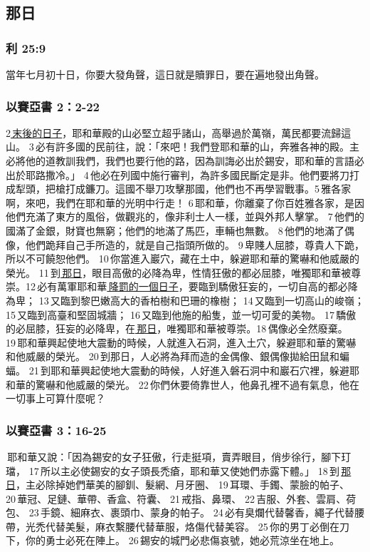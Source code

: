 \subsection{那日}
\subsubsection{利 25:9}
當年七月初十日，你要大發角聲，這日就是贖罪日，要在遍地發出角聲。

\subsubsection{以賽亞書 2：2-22}
2\underline{ 末後的日子}，耶和華殿的山必堅立超乎諸山，高舉過於萬嶺，萬民都要流歸這山。 3 必有許多國的民前往，說：「來吧！我們登耶和華的山，奔雅各神的殿。主必將他的道教訓我們，我們也要行他的路，因為訓誨必出於錫安，耶和華的言語必出於耶路撒冷。」 4 他必在列國中施行審判，為許多國民斷定是非。他們要將刀打成犁頭，把槍打成鐮刀。這國不舉刀攻擊那國，他們也不再學習戰事。5 雅各家啊，來吧，我們在耶和華的光明中行走！ 6 耶和華，你離棄了你百姓雅各家，是因他們充滿了東方的風俗，做觀兆的，像非利士人一樣，並與外邦人擊掌。 7 他們的國滿了金銀，財寶也無窮；他們的地滿了馬匹，車輛也無數。 8 他們的地滿了偶像，他們跪拜自己手所造的，就是自己指頭所做的。 9 卑賤人屈膝，尊貴人下跪，所以不可饒恕他們。 10 你當進入巖穴，藏在土中，躲避耶和華的驚嚇和他威嚴的榮光。 11 到\underline{ 那日}，眼目高傲的必降為卑，性情狂傲的都必屈膝，唯獨耶和華被尊崇。12 必有萬軍耶和華\underline{ 降罰的一個日子}，要臨到驕傲狂妄的，一切自高的都必降為卑； 13 又臨到黎巴嫩高大的香柏樹和巴珊的橡樹； 14 又臨到一切高山的峻嶺； 15 又臨到高臺和堅固城牆； 16 又臨到他施的船隻，並一切可愛的美物。 17 驕傲的必屈膝，狂妄的必降卑，在\underline{ 那日}，唯獨耶和華被尊崇。18 偶像必全然廢棄。 19 耶和華興起使地大震動的時候，人就進入石洞，進入土穴，躲避耶和華的驚嚇和他威嚴的榮光。 20 到那日，人必將為拜而造的金偶像、銀偶像拋給田鼠和蝙蝠。 21 到耶和華興起使地大震動的時候，人好進入磐石洞中和巖石穴裡，躲避耶和華的驚嚇和他威嚴的榮光。 22 你們休要倚靠世人，他鼻孔裡不過有氣息，他在一切事上可算什麼呢？


\subsubsection{以賽亞書 3：16-25}
 耶和華又說：「因為錫安的女子狂傲，行走挺項，賣弄眼目，俏步徐行，腳下玎璫， 17 所以主必使錫安的女子頭長禿瘡，耶和華又使她們赤露下體。」 18 到 \underline{那日}，主必除掉她們華美的腳釧、髮網、月牙圈、 19 耳環、手鐲、蒙臉的帕子、 20 華冠、足鏈、華帶、香盒、符囊、 21 戒指、鼻環、 22 吉服、外套、雲肩、荷包、 23 手鏡、細麻衣、裹頭巾、蒙身的帕子。 24 必有臭爛代替馨香，繩子代替腰帶，光禿代替美髮，麻衣繫腰代替華服，烙傷代替美容。 25 你的男丁必倒在刀下，你的勇士必死在陣上。 26 錫安的城門必悲傷哀號，她必荒涼坐在地上。

